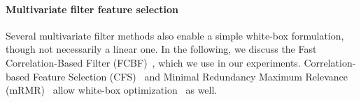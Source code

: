 \documentclass[conference]{IEEEtran}
\theoremstyle{definition}
\begin{document}
\paragraph{Multivariate filter feature selection}

Several multivariate filter methods also enable a simple white-box formulation, though not necessarily a linear one.
In the following, we discuss the Fast Correlation-Based Filter (FCBF)~\cite{yu2003feature}, which we use in our experiments.
Correlation-based Feature Selection (CFS)~\cite{hall1999correlation} and Minimal Redundancy Maximum Relevance (mRMR)~\cite{peng2005feature} allow white-box optimization~\cite{nguyen2014effective} as well.

%
%
%
\end{document}
